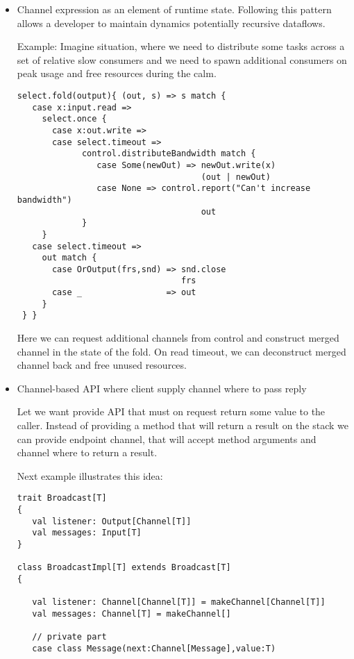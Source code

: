 \documentclass[12pt]{article}
\begin{document}
\begin{itemize}
 \item Channel expression as an element of runtime state. Following this pattern allows a developer to maintain dynamics potentially recursive dataflows. 
 
 Example: 
  Imagine situation, where we need to distribute some tasks across a set of relative slow consumers and we need to spawn additional consumers on peak usage and free resources during the calm. 

\begin{Verbatim}[fontsize=\small]
 select.fold(output){ (out, s) => s match {
   case x:input.read =>
     select.once {
       case x:out.write =>
       case select.timeout =>
             control.distributeBandwidth match {
                case Some(newOut) => newOut.write(x)
                                     (out | newOut)
                case None => control.report("Can't increase bandwidth")
                                     out
             }
     }
   case select.timeout =>
     out match {
       case OrOutput(frs,snd) => snd.close
                                 frs
       case _                 => out
     }
 } }
\end{Verbatim}

 Here we can request additional channels from control and construct merged channel in the state of the fold. On read timeout, we can deconstruct merged channel back and free unused resources.

\item{ Channel-based API where client supply channel where to pass reply }

 Let we want provide API that must on request return some value to the caller. Instead of providing a method that will return a result on the stack we can provide endpoint channel, that will accept method arguments and channel where to return a result. 

 Next example illustrates this idea:

\begin{Verbatim}[fontsize=\small]
trait Broadcast[T]
{
   val listener: Output[Channel[T]]
   val messages: Input[T] 
}

class BroadcastImpl[T] extends Broadcast[T]
{

   val listener: Channel[Channel[T]] = makeChannel[Channel[T]]
   val messages: Channel[T] = makeChannel[]

   // private part
   case class Message(next:Channel[Message],value:T)


\end{Verbatim}
\end{itemize}
\end{document}
